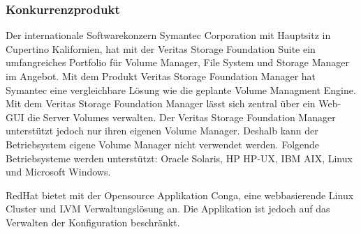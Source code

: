 \subsubsection{Konkurrenzprodukt}
Der internationale Softwarekonzern Symantec Corporation mit Hauptsitz in Cupertino Kalifornien, hat mit der Veritas Storage Foundation Suite ein umfangreiches Portfolio für Volume Manager, File System und Storage Manager im Angebot. Mit dem Produkt Veritas Storage Foundation Manager hat Symantec eine vergleichbare Lösung wie die geplante Volume Managment Engine. Mit dem Veritas Storage Foundation Manager lässt sich zentral über ein Web-GUI die Server Volumes verwalten. 
Der Veritas Storage Foundation Manager unterstützt jedoch nur ihren eigenen Volume Manager. Deshalb kann der Betriebsystem eigene Volume Manager nicht verwendet werden. Folgende Betriebsysteme werden unterstützt: Oracle Solaris, HP HP-UX, IBM AIX, Linux und Microsoft Windows.

RedHat bietet mit der Opensource Applikation Conga, eine webbasierende Linux Cluster und LVM Verwaltungslösung an. Die Applikation ist jedoch auf das Verwalten der Konfiguration beschränkt.